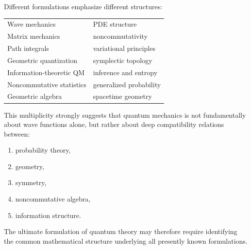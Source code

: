 \documentclass[11pt]{article}
\begin{document}
Different formulations emphasize different structures:

\begin{center}
\begin{tabular}{ll}
Wave mechanics & PDE structure \\
Matrix mechanics & noncommutativity \\
Path integrals & variational principles \\
Geometric quantization & symplectic topology \\
Information-theoretic QM & inference and entropy \\
Noncommutative statistics & generalized probability \\
Geometric algebra & spacetime geometry
\end{tabular}
\end{center}

This multiplicity strongly suggests that quantum mechanics is not fundamentally about wave functions alone, but rather about deep compatibility relations between:

\begin{enumerate}
\item probability theory,
\item geometry,
\item symmetry,
\item noncommutative algebra,
\item information structure.
\end{enumerate}

The ultimate formulation of quantum theory may therefore require identifying the common mathematical structure underlying all presently known formulations.
\end{document}
